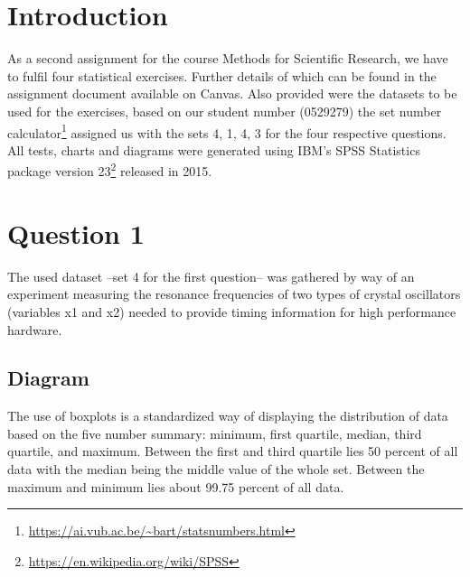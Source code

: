 \documentclass[14]{article}
\begin{document}
\author{\textbf{Faculty of Sciences and Bio-Engineering Sciences}\\[2\baselineskip]\newline\textbf{Arthur Chomé - 0529279}}

\date{ \LARGE Assignment 2: Statistics}
\title{\vspace{-8cm}}%

\maketitle

\section{Introduction}
As a second assignment for the course Methods for Scientific Research, we have to fulfil four statistical exercises. Further details of which can be found in the assignment document available on Canvas. Also provided were the datasets to be used for the exercises, based on our student number (0529279) the set number calculator\footnote{\protect\url{https://ai.vub.ac.be/~bart/statsnumbers.html}} assigned us with the sets 4, 1, 4, 3 for the four respective questions. All tests, charts and diagrams were generated using IBM's SPSS Statistics package version 23\footnote{\protect\url{https://en.wikipedia.org/wiki/SPSS}} released in 2015. 

\section{Question 1}
The used dataset --set 4 for the first question-- was gathered by way of an experiment measuring the resonance frequencies of two types of crystal oscillators (variables x1 and x2) needed to provide timing information for high performance hardware. 

\subsection{Diagram}
The use of boxplots is a standardized way of displaying the distribution of data based on the five number summary: minimum, first quartile, median, third quartile, and maximum. Between the first and third quartile lies 50 percent of all data with the median being the middle value of the whole set. Between the maximum and minimum lies about 99.75 percent of all data.
\end{document}
